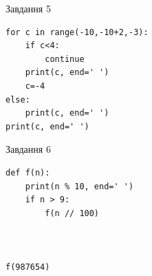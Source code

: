 \documentclass[12pt, ukrainian]{article}
\begin{document}
{\vspace{15mm}
\begin{minipage}[t]{9.7cm}                
{\begin{center}Завдання {5}\end{center}}
\begin{verbatim}
for c in range(-10,-10+2,-3):
    if c<4:
        continue
    print(c, end=' ')
    c=-4
else:
    print(c, end=' ')
print(c, end=' ')
\end{verbatim}     
\end{minipage}
\vline \hspace{8mm}
\begin{minipage}[t]{8.0cm}                
{\begin{center}Завдання {6}\end{center}}
\begin{verbatim}
def f(n):
    print(n % 10, end=' ')
    if n > 9:
        f(n // 100)
    


f(987654)
\end{verbatim}     
\end{minipage}

}
\newpage
\end{document}
